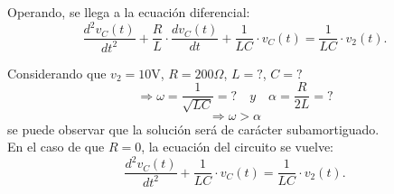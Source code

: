 \documentclass[a4paper]{article}
\begin{document}
%
%
%
Operando, se llega a la ecuación diferencial:
\begin{equation}
\frac{d^{2}v_{C}(t)}{dt^{2}}+\frac{R}{L}\cdot\frac{dv_{C}(t)}{dt}+\frac{1}{LC}\cdot v_{C}(t)=\frac{1}{LC}\cdot v_{2}(t).
\end{equation}

Considerando que $v_2 = 10\textrm{V}$, $R = 200\Omega$, $L = ?$, $C = ?$ \[\Rightarrow \omega=\frac{1}{\sqrt{LC}}= ?\quad y \quad \alpha=\frac{R}{2L}= ?\] \[\Rightarrow \omega > \alpha\] se puede observar que la solución será de carácter subamortiguado.\\

En el caso de que $R=0$, la ecuación del circuito se vuelve:
\begin{equation}
\frac{d^{2}v_{C}(t)}{dt^{2}}+\frac{1}{LC}\cdot v_{C}(t)=\frac{1}{LC}\cdot v_{2}(t).
\end{equation}
\end{document}
